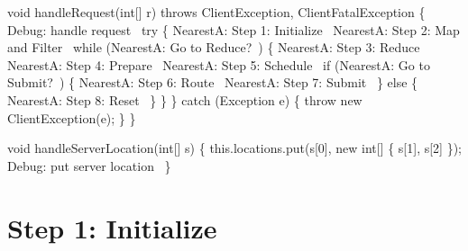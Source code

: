 \nwenddocs{}\endmoddef\nwstartdeflinemarkup{}\nwenddeflinemarkup
void handleRequest(int[] r) throws ClientException, ClientFatalException \{
  \LA{}Debug: handle request~{\nwtagstyle{}}\RA{}
  try \{
    \LA{}NearestA: Step 1: Initialize~{\nwtagstyle{}}\RA{}
    \LA{}NearestA: Step 2: Map and Filter~{\nwtagstyle{}}\RA{}
    while (\LA{}NearestA: Go to Reduce?~{\nwtagstyle{}}\RA{}) \{
      \LA{}NearestA: Step 3: Reduce~{\nwtagstyle{}}\RA{}
      \LA{}NearestA: Step 4: Prepare~{\nwtagstyle{}}\RA{}
      \LA{}NearestA: Step 5: Schedule~{\nwtagstyle{}}\RA{}
      if (\LA{}NearestA: Go to Submit?~{\nwtagstyle{}}\RA{}) \{
        \LA{}NearestA: Step 6: Route~{\nwtagstyle{}}\RA{}
        \LA{}NearestA: Step 7: Submit~{\nwtagstyle{}}\RA{}
      \} else \{
        \LA{}NearestA: Step 8: Reset~{\nwtagstyle{}}\RA{}
      \}
    \}
  \} catch (Exception e) \{
    throw new ClientException(e);
  \}
\}
\nwendcode{}\nwdocspar

\nwenddocs{}\endmoddef\nwstartdeflinemarkup{}\nwenddeflinemarkup
void handleServerLocation(int[] s) \{
  this.locations.put(s[0], new int[] \{ s[1], s[2] \});
  \LA{}Debug: put server location~{\nwtagstyle{}}\RA{}
\}
\nwendcode{}\nwdocspar

\section{Step 1: Initialize}

